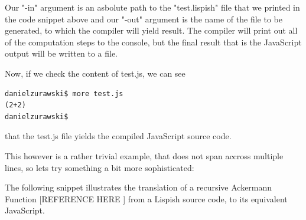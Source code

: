 Our "-in" argument is an asbolute path to the "test.lispish" file that we printed in the code snippet above and our "-out" argument is the name of the file to be generated, to which the compiler will yield result. 
The compiler will print out all of the computation steps to the console, but the final result that is the JavaScript output will be written to a file.

Now, if we check the content of test.js, we can see
\begin{verbatim}
danielzurawski$ more test.js
(2+2)
danielzurawski$
\end{verbatim}
that the test.js file yields the compiled JavaScript source code. 

This however is a rather trivial example, that does not span accross multiple lines, so lets try something a bit more sophisticated:

The following snippet illustrates the translation of a recursive Ackermann Function [REFERENCE HERE ] from a Lispish source code, to its equivalent JavaScript. 

